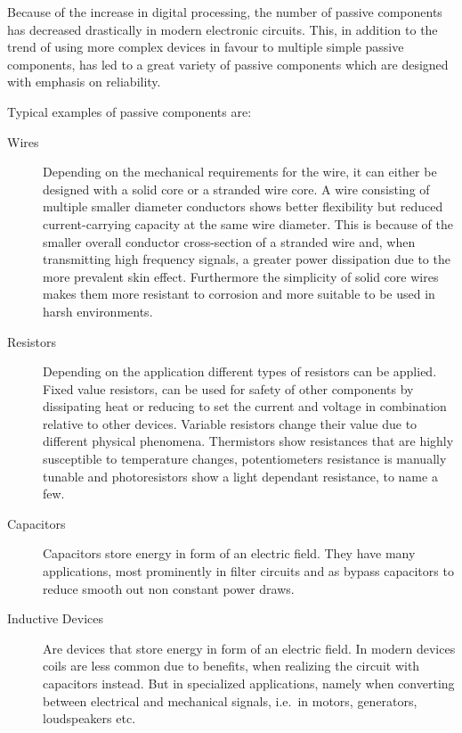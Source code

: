 Because of the increase in digital processing, the number of passive components has decreased drastically in modern electronic circuits. This, in addition to the trend of using more complex devices in favour to multiple simple passive components, has led to a great variety of passive components which are designed with emphasis on reliability.

Typical examples of passive components are:
\begin{description}
  \item[Wires] Depending on the mechanical requirements for the wire, it can either be designed with a solid core or a stranded wire core. A wire consisting of multiple smaller diameter conductors shows better flexibility but reduced current-carrying capacity at the same wire diameter. This is because of the smaller overall conductor cross-section of a stranded wire and, when transmitting high frequency signals, a greater power dissipation due to the more prevalent skin effect. Furthermore the simplicity of solid core wires makes them more resistant to corrosion and more suitable to be used in harsh environments.
  \item[Resistors] Depending on the application different types of resistors can be applied. Fixed value resistors, can be used for safety of other components by dissipating heat or reducing to set the current and voltage in combination relative to other devices. Variable resistors change their value due to different physical phenomena. Thermistors show resistances that are highly susceptible to temperature changes, potentiometers resistance is manually tunable and photoresistors show a light dependant resistance, to name a few.
  \item[Capacitors] Capacitors store energy in form of an electric field. They have many applications, most prominently in filter circuits and as bypass capacitors to reduce smooth out non constant power draws.
  \item[Inductive Devices] Are devices that store energy in form of an electric field. In modern devices coils are less common due to benefits, when realizing the circuit with capacitors instead. But in specialized applications, namely when converting between electrical and mechanical signals, i.e.\ in motors, generators, loudspeakers etc.
\end{description}

